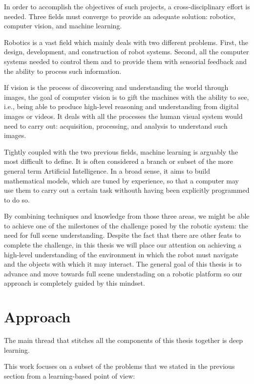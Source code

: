 In order to accomplish the objectives of such projects, a cross-disciplinary effort is needed. Three fields must converge to provide an adequate solution: robotics, computer vision, and machine learning.

Robotics is a vast field which mainly deals with two different problems. First, the design, development, and construction of robot systems. Second, all the computer systems needed to control them and to provide them with sensorial feedback and the ability to process such information.

If vision is the process of discovering and understanding the world through images, the goal of computer vision is to gift the machines with the ability to see, i.e., being able to produce high-level reasoning and understanding from digital images or videos. It deals with all the processes the human visual system would need to carry out: acquisition, processing, and analysis to understand such images.

Tightly coupled with the two previous fields, machine learning is arguably the most difficult to define. It is often considered a branch or subset of the more general term Artificial Intelligence. In a broad sense, it aims to build mathematical models, which are tuned by experience, so that a computer may use them to carry out a certain task withouth having been explicitly programmed to do so.

By combining techniques and knowledge from those three areas, we might be able to achieve one of the milestones of the challenge posed by the robotic system: the need for full scene understanding. Despite the fact that there are other feats to complete the challenge, in this thesis we will place our attention on achieving a high-level understanding of the environment in which the robot must navigate and the objects with which it may interact. The general goal of this thesis is to advance and move towards full scene understading on a robotic platform so our approach is completely guided by this mindset.

\section{Approach}
\label{cha:introduction:sec:approach}

The main thread that stitches all the components of this thesis together is deep learning.

This work focuses on a subset of the problems that we stated in the previous section from a learning-based point of view:

